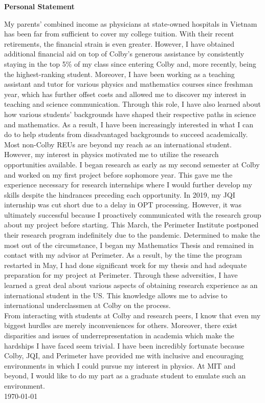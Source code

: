 \documentclass[12pt]{article}
\begin{document}
\begin{center}
	\textbf{Personal Statement}
\end{center}
My parents' combined income as physicians at state-owned hospitals in Vietnam has been far from sufficient to cover my college tuition. With their recent retirements, the financial strain is even greater. However,  I have obtained additional financial aid on top of Colby's generous assistance by consistently staying in the top 5\% of my class since entering Colby and, more recently, being the highest-ranking student. Moreover, I have been working as a teaching assistant and tutor for various physics and mathematics courses since freshman year, which has further offset costs and allowed me to discover my interest in teaching and science communication. Through this role, I have also learned about how various students' backgrounds have shaped their respective paths in science and mathematics. As a result, I have been increasingly interested in what I can do to help students from disadvantaged backgrounds to succeed academically. \\

Most non-Colby REUs are beyond my reach as an international student. However, my interest in physics motivated me to utilize the research opportunities available. I began research as early as my second semester at Colby and worked on my first project before sophomore year. This gave me the experience necessary for research internships where I would further develop my skills despite the hindrances preceding each opportunity. In 2019, my JQI internship was cut short due to a delay in OPT processing. However, it was ultimately successful because I proactively communicated with the research group about my project before starting. This March, the Perimeter Institute postponed their research program indefinitely due to the pandemic. Determined to make the most out of the circumstance, I began my Mathematics Thesis and remained in contact with my advisor at Perimeter. As a result, by the time the program restarted in May, I had done significant work for my thesis and had adequate preparation for my project at Perimeter. Through these adversities, I have learned a great deal about various aspects of obtaining research experience as an international student in the US. This knowledge allows me to advise to international underclassmen at Colby on the process.\\

From interacting with students at Colby and research peers, I know that even my biggest hurdles are merely inconveniences for others. Moreover, there exist disparities and issues of underrepresentation in academia which make the hardships I have faced seem trivial. I have been incredibly fortunate because Colby, JQI, and Perimeter have provided me with inclusive and encouraging environments in which I could pursue my interest in physics. At MIT and beyond, I would like to do my part as a graduate student to emulate such an environment.\\

\noindent \today
\end{document}
